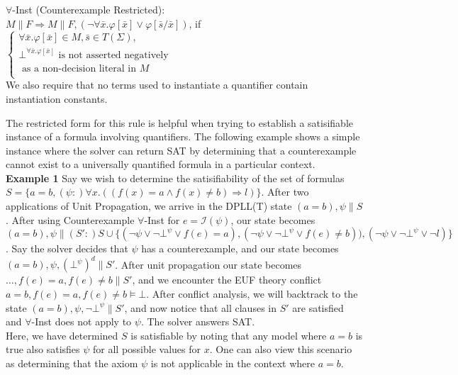 \documentclass{llncs}
\begin{document}
\noindent $\forall$-Inst (Counterexample Restricted): \\

$M \parallel F \Longrightarrow M \parallel F, (\neg \forall \bar{x}. \varphi[ \bar{ x } ] \vee \varphi[ \bar{ s }/\bar{x} ])$, if   
$\begin{cases}
  \forall \bar{x}. \varphi[ \bar{ x } ] \in M, \bar{ s } \in T( \Sigma ), \\
  \bot^{\forall \bar{x}. \varphi[ \bar{ x } ]} \text{ is not asserted negatively }\\
  \text{ \ \ \ as a non-decision literal in $M$ } \\    
\end{cases}$ \\

We also require that no terms used to instantiate a quantifier contain instantiation constants.

The restricted form for this rule is helpful when trying to establish a satisifiable instance of a formula involving quantifiers.
The following example shows a simple instance where the solver can return SAT by determining that a counterexample cannot exist to a universally quantified formula in a particular context. \\

{\bf Example 1}
Say we wish to determine the satisifiability of the set of formulas $S = \{ a = b, (\psi :) \forall x. ((f(x) = a \wedge f(x) \neq b) \Rightarrow l) \}$.
After two applications of Unit Propagation, we arrive in the DPLL(T) state $( a = b ), \psi \parallel S$.
After using Counterexample $\forall$-Inst for $e = \mathcal{I}( \psi )$, our state becomes $( a = b ), \psi \parallel (S':) S \cup \{ (\neg \psi \vee \neg \bot^\psi \vee f( e ) = a), (\neg \psi \vee \neg \bot^\psi \vee f( e ) \neq b)), (\neg \psi \vee \neg \bot^\psi \vee \neg l) \}$.
Say the solver decides that $\psi$ has a counterexample, and our state becomes $( a = b ), \psi, (\bot^\psi)^d \parallel S'$. 
After unit propagation our state becomes $\ldots, f( e ) = a, f( e ) \neq b \parallel S'$, and we encounter the EUF theory conflict $a = b, f( e ) = a, f( e ) \neq b \models \bot$.
After conflict analysis, we will backtrack to the state $( a = b ), \psi, \neg \bot^\psi \parallel S'$, and now notice that all clauses in $S'$ are satisfied and $\forall$-Inst does not apply to $\psi$.
The solver answers SAT. \\

Here, we have determined $S$ is satisfiable by noting that any model where $a = b$ is true also satisfies $\psi$ for all possible values for $x$.
One can also view this scenario as determining that the axiom $\psi$ is not applicable in the context where $a = b$.
\end{document}
